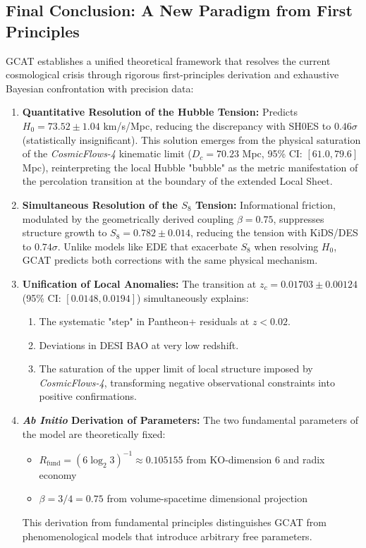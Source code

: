 \documentclass[12pt, a4paper]{article}
\theoremstyle{plain}
\theoremstyle{definition}
\begin{document}
\subsection{Final Conclusion: A New Paradigm from First Principles}

GCAT establishes a unified theoretical framework that resolves the current cosmological crisis through rigorous first-principles derivation and exhaustive Bayesian confrontation with precision data:

\begin{enumerate}
    \item \textbf{Quantitative Resolution of the Hubble Tension:} Predicts $H_0 = 73.52 \pm 1.04$ km/s/Mpc, reducing the discrepancy with SH0ES to $0.46\sigma$ (statistically insignificant). This solution emerges from the physical saturation of the \textit{CosmicFlows-4} kinematic limit ($D_c = 70.23$ Mpc, 95\% CI: $[61.0, 79.6]$ Mpc), reinterpreting the local Hubble "bubble" as the metric manifestation of the percolation transition at the boundary of the extended Local Sheet.
    
    \item \textbf{Simultaneous Resolution of the $S_8$ Tension:} Informational friction, modulated by the geometrically derived coupling $\beta = 0.75$, suppresses structure growth to $S_8 = 0.782 \pm 0.014$, reducing the tension with KiDS/DES to $0.74\sigma$. Unlike models like EDE that exacerbate $S_8$ when resolving $H_0$, GCAT predicts both corrections with the same physical mechanism.
    
    \item \textbf{Unification of Local Anomalies:} The transition at $z_c = 0.01703 \pm 0.00124$ (95\% CI: $[0.0148, 0.0194]$) simultaneously explains:
    \begin{enumerate}
        \item The systematic "step" in Pantheon+ residuals at $z < 0.02$.
        \item Deviations in DESI BAO at very low redshift.
        \item The saturation of the upper limit of local structure imposed by \textit{CosmicFlows-4}, transforming negative observational constraints into positive confirmations.
    \end{enumerate}
    
    \item \textbf{\textit{Ab Initio} Derivation of Parameters:} The two fundamental parameters of the model are theoretically fixed:
    \begin{itemize}
        \item $R_{\text{fund}} = (6\log_2 3)^{-1} \approx 0.105155$ from KO-dimension 6 and radix economy
        \item $\beta = 3/4 = 0.75$ from volume-spacetime dimensional projection
    \end{itemize}
    This derivation from fundamental principles distinguishes GCAT from phenomenological models that introduce arbitrary free parameters.
    

\end{enumerate}
\end{document}

